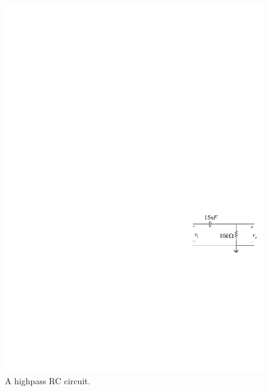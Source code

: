 \documentclass[11pt]{article}
\begin{document}
\begin{question}


    \begin{figure}[H]
        \centering
        \includegraphics[scale=1.2,angle=0]{Fig/cir3.pdf}
        \caption{A highpass RC circuit.} \label{fig:cir3}
    \end{figure}


\end{question}
\end{document}
